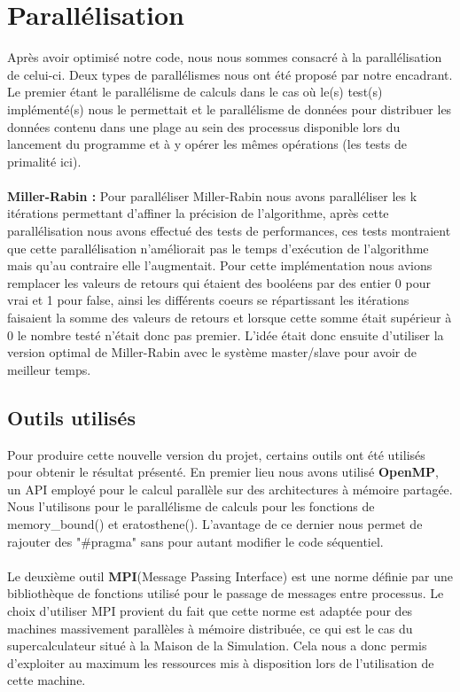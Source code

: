 	\section{Parallélisation}
	Après avoir optimisé notre code, nous nous sommes consacré à la parallélisation de celui-ci. Deux types de parallélismes nous ont été proposé par notre encadrant. Le premier étant le parallélisme de calculs dans le cas où le(s) test(s) implémenté(s) nous le permettait et le parallélisme de données pour distribuer les données contenu dans une plage au sein des processus disponible lors du lancement du programme et à y opérer les mêmes opérations (les tests de primalité ici).
	
	\paragraph{} \textbf{Miller-Rabin : }
	Pour paralléliser Miller-Rabin nous avons paralléliser les k itérations permettant d'affiner la précision de l'algorithme, après cette parallélisation nous avons effectué des tests de performances, ces tests montraient que cette parallélisation n'améliorait pas le temps d'exécution de l'algorithme mais qu'au contraire elle l'augmentait. Pour cette implémentation nous avions remplacer les valeurs de retours qui étaient des booléens par des entier 0 pour vrai et 1 pour false, ainsi les différents coeurs se répartissant les itérations faisaient la somme des valeurs de retours et lorsque cette somme était supérieur à 0 le nombre testé n'était donc pas premier. L'idée était donc ensuite d'utiliser la version optimal de Miller-Rabin avec le système master/slave pour avoir de meilleur temps.  
	
		\subsection{Outils utilisés}
Pour produire cette nouvelle version du projet, certains outils ont été utilisés pour obtenir le résultat présenté. En premier lieu nous avons utilisé \textbf{OpenMP}, un API employé pour le calcul parallèle sur des architectures à mémoire partagée. Nous l'utilisons pour le parallélisme de calculs pour les fonctions de memory\_bound() et eratosthene(). L'avantage de ce dernier nous permet de rajouter des "\#pragma" sans pour autant modifier le code séquentiel.

		\paragraph{}Le deuxième outil \textbf{MPI}(Message Passing Interface) est une norme définie par une bibliothèque de fonctions utilisé pour le passage de messages entre processus. Le choix d'utiliser MPI provient du fait que cette norme est adaptée pour des machines massivement parallèles à mémoire distribuée, ce qui est le cas du supercalculateur situé à la Maison de la Simulation. Cela nous a donc permis d'exploiter au maximum les ressources mis à disposition lors de l'utilisation de cette machine. 
		
